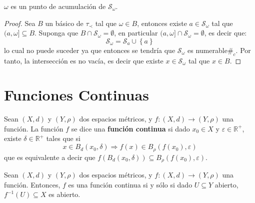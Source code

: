 \documentclass[12pt]{report}
\theoremstyle{largebreak}
\newcommand\cf[3]{\ensuremath{#1:#2\rightarrow#3}}
\newcommand\contradiction{\ensuremath{\#_c}}
\begin{document}
    \begin{propo}
        $\omega$ es un punto de acumulación de $\mathcal{S}_\omega$.
    \end{propo}

    \begin{proof}
        Sea $B$ un básico de $\tau_\prec$ tal que $\omega\in B$, entonces existe $a\in\mathcal{S}_\omega$ tal que $(a,\omega]\subseteq B$. Suponga que $B\cap \mathcal{S}_\omega=\emptyset$, en particular $(a,\omega]\cap\mathcal{S}_\omega=\emptyset$, es decir que:
        \begin{equation*}
            \mathcal{S}_\omega=\mathcal{S}_a\cup\left\{a\right\}
        \end{equation*}
        lo cual no puede suceder ya que entonces se tendría que $\mathcal{S}_\omega$ es numerable\contradiction. Por tanto, la intersección es no vacía, es decir que existe $x\in \mathcal{S}_\omega$ tal que $x\in B$.
    \end{proof}

    \section{Funciones Continuas}

    \begin{mydef}
        Sean $(X,d)$ y $(Y,\rho)$ dos espacios métricos, y $\cf{f}{(X,d)}{(Y,\rho)}$ una función. La función $f$ se dice una \textbf{función continua} si dado $x_0\in X$ y $\varepsilon\in\mathbb{R}^+$, existe $\delta\in\mathbb{R}^+$ tales que si
        \begin{equation*}
            x\in B_d(x_0,\delta)\Rightarrow f(x)\in B_\rho(f(x_0),\varepsilon)
        \end{equation*}
        que es equivalente a decir que $f(B_d(x_0,\delta))\subseteq B_\rho(f(x_0),\varepsilon)$.
    \end{mydef}

    \begin{propo}
        Sean $(X,d)$ y $(Y,\rho)$ dos espacios métricos, y $\cf{f}{(X,d)}{(Y,\rho)}$ una función. Entonces, $f$ es una función continua si y sólo si dado $U\subseteq Y$ abierto, $f^{-1}(U)\subseteq X$ es abierto.
    \end{propo}
\end{document}
